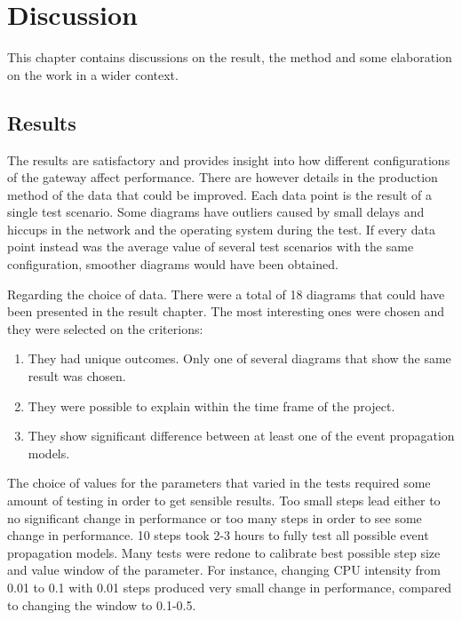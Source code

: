 \chapter{Discussion}
\label{cha:discussion}

This chapter contains discussions on the result, the method and some
elaboration on the work in a wider context.

\section{Results}
\label{sec:discussion-results}

The results are satisfactory and provides insight into how different
configurations of the gateway affect performance. There are however details in
the production method of the data that could be improved. Each data point is
the result of a single test scenario. Some diagrams have outliers caused by
small delays and hiccups in the network and the operating system during the
test. If every data point instead was the average value of several test
scenarios with the same configuration, smoother diagrams would have been
obtained.

Regarding the choice of data. There were a total of 18 diagrams that could have
been presented in the result chapter. The most interesting ones were chosen and
they were selected on the criterions:

\begin{enumerate}
    \item They had unique outcomes. Only one of several diagrams that show the
        same result was chosen.
    \item They were possible to explain within the time frame of the project.
    \item They show significant difference between at least one of the event
        propagation models.
\end{enumerate}

The choice of values for the parameters that varied in the tests required some
amount of testing in order to get sensible results. Too small steps lead either
to no significant change in performance or too many steps in order to see some
change in performance. 10 steps took 2-3 hours to fully test all possible
event propagation models. Many tests were redone to calibrate best possible
step size and value window of the parameter. For instance, changing CPU
intensity from 0.01 to 0.1 with 0.01 steps produced very small change in
performance, compared to changing the window to 0.1-0.5.

